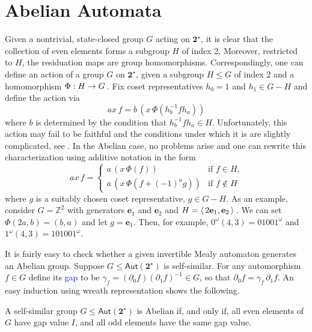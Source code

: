 \documentclass[12pt]{svmult}
\def\emph#1{\textcolor{blue}{#1}}
\def\2{\mathbf{2}}
\def\Aut{\mathsf{Aut}}
\def\SS{\Star{\2}}
\def\gap#1{\gamma_{#1}}         %
\def\oa{\overline{a}}
\def\postomega#1{{#1}^\omega}
\def\resid#1#2{\partial_{#1}{#2}}         %
\def\struct#1{ \left\langle \, {#1} \,\right\rangle\futurelet\next\mathcorr}
\def\Z{\mathbb{Z}}
\def\unvo{\mathbf{e}_{1}}
\def\unvt{\mathbf{e}_{2}}
\def\mathcorr{\ifx\next.\mkern -.3mu\else\ifx\next,\mkern -.3mu\else\,\fi\fi}
\def\func#1#2#3{{#1}:{#2}\to{#3}\futurelet\next\mathcorr}
\providecommand{\Star}[1]{{#1}^{\star}}
\begin{document}
\section{Abelian Automata}
\label{sec:abelian-automata}

Given a nontrivial, state-closed group  $G$ acting on $\SS$, it is clear that the collection 
of even elements forms a subgroup $H$ of index 2.
Moreover, restricted to $H$, the residuation maps are group homomorphisms.
Correspondingly, one can define an action of a group $G$ on $\SS$, 
given a subgroup $H \leq G$ of index 2 and a homomorphism $\func{\Phi}{H}{G}$. 
Fix coset representatives $h_{0} = 1$ and $h_{1} \in G - H$ and define the action via 
%
$$
     ax \, f = b \, (x \, \Phi(h_{b}^{-1} f h_{a}))
$$
%
where $b$ is determined by the condition that $h_{b}^{-1}fh_{a} \in H$. 
Unfortunately, this action may fail to be faithful and the conditions 
under which it is are slightly complicated, see 
\cite{Nekrashevych05:self_similar_groups,NekrashevychSidki04:automorphisms}.
In the Abelian case, no problems arise and one can rewrite this characterization
using additive notation in the form 
%
$$
ax \, f   = %
\begin{cases}
a \,( x\,\Phi(f))  & \text{if $f \in H$,}    \\
\oa \,( x\,\Phi(f + (-1)^{a}g))  & \text{if $f \notin H$} 
\end{cases}
$$
%
where $g$ is a suitably chosen coset representative, $g \in G - H$. 
As an example, consider $G = \Z^{2}$ with generators $\unvo$ and $\unvt$ and 
$H = \struct{2\unvo,\unvt}$. 
We can set $\Phi(2a,b) = (b,a)$ and let $g = \unvo$. 
Then, for example,  $\postomega{0} (4,3) = 0100\postomega{1}$ 
and $\postomega{1} (4,3) = 10100\postomega{1}$. 

It is fairly easy to check whether a given invertible Mealy automaton generates 
an Abelian group. 
Suppose $G \leq \Aut(\SS)$ is self-similar.  For any automorphism $f \in G$ 
define its \emph{gap} to be  $\gap{f} = (\resid{0}{f}) (\resid{1}{f})^{-1}  \in G$, 
so that $\resid{0}{f} = \gap{f} \, \resid{1}{f}$. 
An easy induction using wreath representation shows the following. 

\begin{lemma}
\label{lem:abelian}
A self-similar group $G \leq \Aut(\SS)$ is Abelian if, and only if, 
all even elements of $G$ have gap value $I$, 
and all odd elements have the same gap value. 
\end{lemma}
\end{document}
